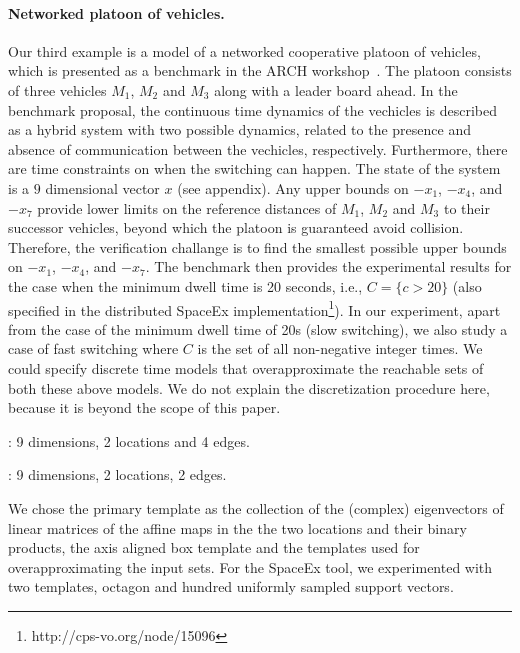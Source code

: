 \paragraph{Networked platoon of vehicles.}
Our third example is a model of a networked cooperative platoon of
vehicles, which is presented as a benchmark in the ARCH
workshop~\cite{makhlouf2014networked}.  The platoon consists of three
vehicles $M_1$, $M_2$ and $M_3$ along with a leader board ahead. %
In the benchmark proposal, the continuous time dynamics of the
vechicles is described as a hybrid system with two possible dynamics,
related to the presence and absence of communication between the
vechicles, respectively.  Furthermore, there are time constraints on
when the switching can happen.
The state of the system is a $9$ dimensional vector $x$ (see appendix).
 Any upper bounds on $-x_1$, $-x_4$, and $-x_7$ provide lower limits
 on the reference distances of $M_1$, $M_2$ and $M_3$ to their
 successor vehicles, beyond which the platoon is guaranteed avoid
 collision.  Therefore, the verification challange is to find the
 smallest possible upper bounds on $-x_1$, $-x_4$, and $-x_7$.  The
 benchmark then provides the experimental results for the case when
 the minimum dwell time is 20 seconds, i.e., $C=\{c>20\}$ (also
 specified in the distributed SpaceEx
 implementation\footnote{http://cps-vo.org/node/15096}).  In our
 experiment, apart from the case of the minimum dwell time of 20s
 (slow switching), we also study a case of fast switching where $C$ is
 the set of all non-negative integer times.  We could specify discrete time
 models that overapproximate the reachable sets of both these above
 models.  We do not explain the discretization procedure here, because
 it is beyond the scope of this paper.

: 9 dimensions, 2
locations and 4 edges.

: 9 dimensions, 2
locations, 2 edges.

  We chose the primary template
as the collection of the (complex) eigenvectors of linear matrices of
the affine maps in the the two locations and their binary products,
the axis aligned box template and the templates used for
overapproximating the input sets. For the SpaceEx tool, we
experimented with two templates, octagon and hundred uniformly sampled
support vectors.

